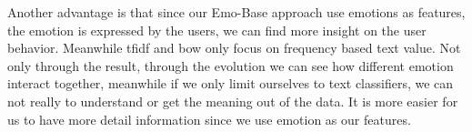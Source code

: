 \documentclass[12pt,a4paper]{report}
\theoremstyle{definition}
\begin{document}
\begin{CJK}{UTF8}{bsmi}
        \par Another advantage is that since our Emo-Base approach use emotions as features, the emotion is expressed by the users, we can find more insight on the user behavior.
        Meanwhile tfidf and bow only focus on frequency based text value.
        Not only through the result, through the evolution we can see how different emotion interact together, meanwhile if we only limit ourselves to text classifiers, we can not really to understand or get the meaning out of the data. It is more easier for us to have more detail information since we use emotion as our features.
        
\renewcommand{\arraystretch}{1}
\begin{table}[H]
    
\centering


\end{table}
\end{CJK}
\end{document}
